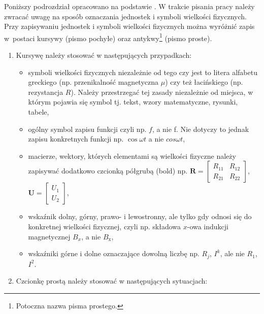 \documentclass[12pt,twoside]{article}
\begin{document}
Poniższy podrozdział opracowano na podstawie \cite{Pawluk2001}. W trakcie pisania pracy należy zwracać uwagę na sposób oznaczania jednostek i symboli wielkości fizycznych. Przy zapisywaniu jednostek i symboli wielkości fizycznych można wyróżnić zapis w~postaci kursywy (pismo pochyłe) oraz antykwy\footnote{Potoczna nazwa pisma prostego.} (pismo proste). 

\begin{enumerate}[label=\arabic*), leftmargin=1.25cm]
\item Kursywę należy stosować w następujących przypadkach:

\begin{itemize}[label={--},labelsep=0.4cm,leftmargin=0.6cm] %
\item symboli wielkości fizycznych niezależnie od tego czy jest to litera alfabetu greckiego (np. przenikalność magnetyczna $\mu$) czy też łacińskiego (np. rezystancja $R$). Należy przestrzegać tej zasady niezależnie od miejsca, w którym pojawia się symbol tj. tekst, wzory matematyczne, rysunki, tabele,

\item ogólny symbol zapisu funkcji czyli np. $f$, a nie f. Nie dotyczy to jednak zapisu konkretnych funkcji np. $\cos \omega t$ a nie $cos \omega t$,

\item macierze, wektory, których elementami są wielkości fizyczne należy zapisywać dodatkowo czcionką półgrubą (bold) np. 
$\bm{R} = \left[ 
\begin{array}{cc}
R_{11} & R_{12} \\
R_{21} & R_{22} 
\end{array} 
\right]$,
$\bm{U} = \left[ 
\begin{array}{c}
U_{1} \\
U_{2} 
\end{array} 
\right]$,

\item wskaźnik dolny, górny, prawo- i lewostronny, ale tylko gdy odnosi się do konkretnej wielkości fizycznej, czyli np. składowa $x$-owa indukcji magnetycznej $B_x$, a nie $B_{\mathrm{x}}$,

\item wskaźniki górne i dolne oznaczające dowolną liczbę np. $R_j$, $I^k$, ale nie $R_\mathit{1}$, $I^\mathit{2}$.

\end{itemize}

\item Czcionkę prostą należy stosować w następujących sytuacjach:


\end{enumerate}
\end{document}
